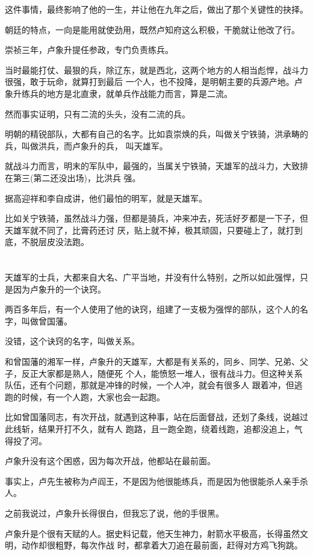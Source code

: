 \documentclass[11pt,a4paper,onecolumn]{article}
\begin{document}
这件事情，最终影响了他的一生，并让他在九年之后，做出了那个关键性的抉择。

朝廷的特点，一向是能用就使劲用，既然卢知府这么积极，干脆就让他改了行。

崇祯三年，卢象升提任参政，专门负责练兵。

当时最能打仗、最狠的兵，除辽东，就是西北，这两个地方的人相当彪悍，战斗力很强，敢于玩命，就算打到最后
一个人，也不投降，是明朝主要的兵源产地。卢象升练兵的地方是北直隶，就单兵作战能力而言，算是二流。

然而事实证明，只有二流的头头，没有二流的兵。

明朝的精锐部队，大都有自己的名字。比如袁崇焕的兵，叫做关宁铁骑，洪承畴的兵，叫做洪兵，而卢象升的兵，
叫天雄军。

就战斗力而言，明末的军队中，最强的，当属关宁铁骑，天雄军的战斗力，大致排在第三(第二还没出场)，比洪兵
强。

据高迎祥和李自成讲，他们最怕的明军，就是天雄军。

比如关宁铁骑，虽然战斗力强，但都是骑兵，冲来冲去，死活好歹都是一下子，但天雄军就不同了，比膏药还讨
厌，贴上就不掉，极其顽固，只要碰上了，就打到底，不脱层皮没法跑。

\section[\thesection]{}

天雄军的士兵，大都来自大名、广平当地，并没有什么特别，之所以如此强悍，只是因为卢象升的一个诀窍。

两百多年后，有一个人使用了他的诀窍，组建了一支极为强悍的部队，这个人的名字，叫做曾国藩。

没错，这个诀窍的名字，叫做关系。

和曾国藩的湘军一样，卢象升的天雄军，大都是有关系的，同乡、同学、兄弟、父子，反正大家都是熟人，随便死
个人，能愤怒一堆人，很有战斗力。但这种关系队伍，还有个问题，那就是冲锋的时候，一个人冲，就会有很多人
跟着冲，但逃跑的时候，有一个人跑，大家也会一起跑。

比如曾国藩同志，有次开战，就遇到这种事，站在后面督战，还划了条线，说越过此线斩，结果开打不久，就有人
跑路，且一跑全跑，绕着线跑，追都没追上，气得投了河。

卢象升没有这个困惑，因为每次开战，他都站在最前面。

事实上，卢先生被称为卢阎王，不是因为他很能练兵，而是因为他很能杀人\myrule 亲手杀人。

之前我说过，卢象升长得很白，但我忘了说，他的手很黑。

卢象升是个很有天赋的人。据史料记载，他天生神力，射箭水平极高，长得虽然文明，动作却很粗野，每次作战
时，都拿着大刀追在最前面，赶得对方鸡飞狗跳。
\end{document}

